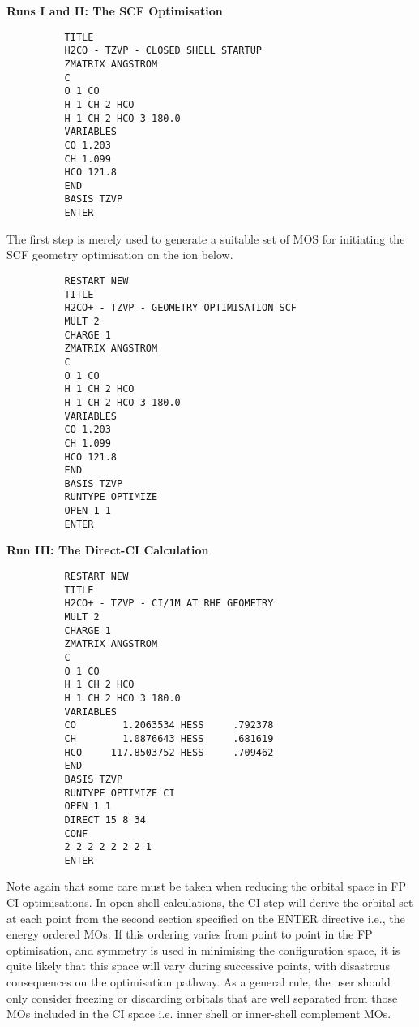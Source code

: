 \documentclass[11pt,fleqn]{article}
\begin{document}
{\bf Runs I and II: The SCF Optimisation}
{
\footnotesize
\begin{verbatim}
          TITLE
          H2CO - TZVP - CLOSED SHELL STARTUP
          ZMATRIX ANGSTROM
          C
          O 1 CO
          H 1 CH 2 HCO
          H 1 CH 2 HCO 3 180.0
          VARIABLES
          CO 1.203
          CH 1.099
          HCO 121.8
          END
          BASIS TZVP
          ENTER
\end{verbatim}
}
The first step is merely used to generate a suitable set of
MOS for initiating the SCF geometry optimisation on the
ion below.

{
\footnotesize
\begin{verbatim}
          RESTART NEW
          TITLE
          H2CO+ - TZVP - GEOMETRY OPTIMISATION SCF
          MULT 2
          CHARGE 1
          ZMATRIX ANGSTROM
          C
          O 1 CO
          H 1 CH 2 HCO
          H 1 CH 2 HCO 3 180.0
          VARIABLES
          CO 1.203
          CH 1.099
          HCO 121.8
          END
          BASIS TZVP
          RUNTYPE OPTIMIZE 
          OPEN 1 1
          ENTER 
\end{verbatim}
}

{\bf Run III: The Direct-CI Calculation}
{
\footnotesize
\begin{verbatim}
          RESTART NEW
          TITLE
          H2CO+ - TZVP - CI/1M AT RHF GEOMETRY
          MULT 2
          CHARGE 1
          ZMATRIX ANGSTROM
          C
          O 1 CO
          H 1 CH 2 HCO
          H 1 CH 2 HCO 3 180.0
          VARIABLES
          CO        1.2063534 HESS     .792378
          CH        1.0876643 HESS     .681619
          HCO     117.8503752 HESS     .709462
          END
          BASIS TZVP
          RUNTYPE OPTIMIZE CI
          OPEN 1 1 
          DIRECT 15 8 34
          CONF
          2 2 2 2 2 2 2 1 
          ENTER
\end{verbatim}
}

Note again that some care must be taken when reducing the orbital space
in FP CI optimisations. In open shell calculations, the CI step will
derive the orbital set at each point from the second section specified
on the ENTER directive i.e., the energy ordered MOs. If this ordering
varies from point to point in the FP optimisation, and symmetry is used
in minimising the configuration space, it is quite likely that this space
will vary during successive points, with disastrous consequences on the
optimisation pathway. As a general rule, the user should only consider
freezing or discarding orbitals that are well separated from those MOs
included in the CI space i.e. inner shell or inner-shell complement MOs.
\end{document}
